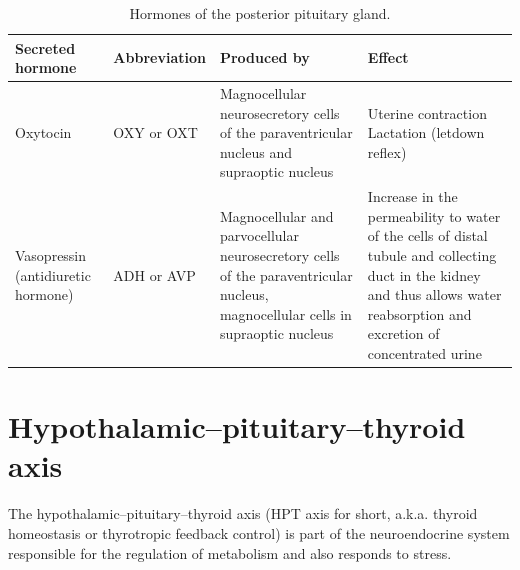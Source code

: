 \begin{table}

\caption{\label{tab:posteriorpituitaryhormones}Hormones of the posterior pituitary gland.}
\centering
\begin{tabular}[t]{>{\raggedright\arraybackslash}p{15em}>{\raggedright\arraybackslash}p{5em}>{\raggedright\arraybackslash}p{15em}>{\raggedright\arraybackslash}p{20em}}
\toprule
Secreted hormone & Abbreviation & Produced by & Effect\\
\midrule
\rowcolor{gray!6}  Oxytocin & OXY or OXT & Magnocellular neurosecretory cells of the paraventricular nucleus and supraoptic nucleus & Uterine contraction Lactation (letdown reflex)\\
Vasopressin (antidiuretic hormone) & ADH or AVP & Magnocellular and parvocellular neurosecretory cells of the paraventricular nucleus, magnocellular cells in supraoptic nucleus & Increase in the permeability to water of the cells of distal tubule and collecting duct in the kidney and thus allows water reabsorption and excretion of concentrated urine\\
\bottomrule
\end{tabular}
\end{table}

\twocolumn

\hypertarget{hypothalamicpituitarythyroid-axis}{%
\section{Hypothalamic--pituitary--thyroid axis}\label{hypothalamicpituitarythyroid-axis}}

The hypothalamic--pituitary--thyroid axis (HPT axis for short, a.k.a. thyroid homeostasis or thyrotropic feedback control) is part of the neuroendocrine system responsible for the regulation of metabolism and also responds to stress.




